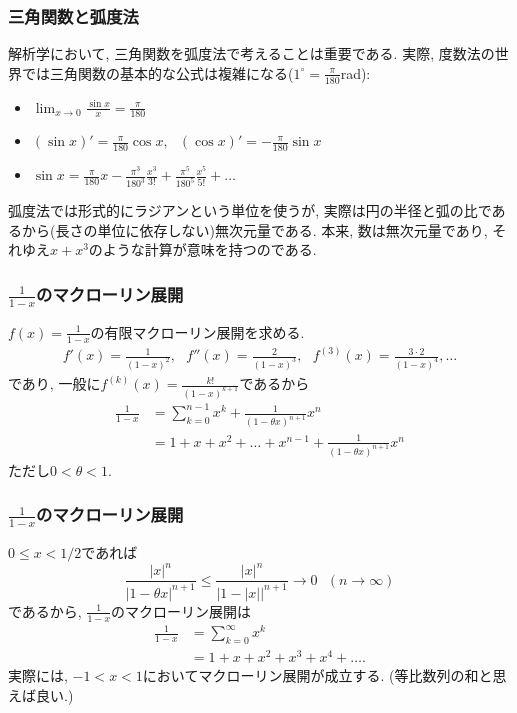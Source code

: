 \documentclass[dvipdfmx,cjk,10.2pt]{beamer}
\theoremstyle{definition}
\begin{document}
\begin{frame}
\frametitle{三角関数と弧度法}

解析学において, 三角関数を弧度法で考えることは重要である. 
実際, 度数法の世界では三角関数の基本的な公式は複雑になる($1^\circ=\frac{\pi}{180}$rad):  
\begin{itemize}
\item $\displaystyle \lim_{x\to0}\frac{\sin x}{x}=\frac{\pi}{180}$
\item $\displaystyle (\sin x)'=\frac{\pi}{180} \cos x, \ \ \  (\cos x)'=-\frac{\pi}{180} \sin x$
\item $\displaystyle \sin x = \frac{\pi}{180} x - \frac{\pi^3}{180^3}\frac{x^3}{3!}+\frac{\pi^5}{180^5}\frac{x^5}{5!}+\dots$
\end{itemize}
弧度法では形式的にラジアンという単位を使うが, 実際は円の半径と弧の比であるから(長さの単位に依存しない)無次元量である. 
本来, 数は無次元量であり, それゆえ$x+x^3$のような計算が意味を持つのである. 

\end{frame}





\begin{frame}
\frametitle{$\frac{1}{1-x}$のマクローリン展開}

$f(x)=\frac{1}{1-x}$の有限マクローリン展開を求める. 
\begin{align*}
f'(x)=\frac{1}{(1-x)^2}, \ \ \ f''(x)=\frac{2}{(1-x)^3}, \ \ \  f^{(3)}(x)=\frac{3\cdot 2}{(1-x)^4}, \dots 
\end{align*}
であり, 一般に$f^{(k)}(x)=\frac{k!}{(1-x)^{k+1}}$であるから
\begin{align*}
\frac{1}{1-x} & = \sum_{k=0}^{n-1}x^k+\frac{1}{(1-\theta x)^{n+1}}x^n \\
& = 1+x+x^2+\dots+x^{n-1}+\frac{1}{(1-\theta x)^{n+1}}x^n
\end{align*}
ただし$0<\theta < 1$. 

\end{frame}




\begin{frame}
\frametitle{$\frac{1}{1-x}$のマクローリン展開}

$0\le x<1/2$であれば
$$
\frac{|x|^n}{|1-\theta x|^{n+1}} \le \frac{|x|^n}{|1-|x||^{n+1}} \to 0 \ \ \ (n\to \infty)
$$
であるから, $\frac{1}{1-x}$のマクローリン展開は
\begin{align*}
\frac{1}{1-x} & = \sum_{k=0}^{\infty} x^k \\
&=1+x+x^2+x^3+x^4+\dots. 
\end{align*}
実際には, $-1<x<1$においてマクローリン展開が成立する. 
(等比数列の和と思えば良い.)

\end{frame}
\end{document}
